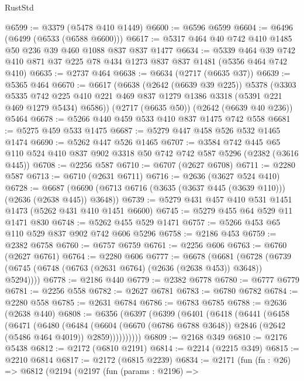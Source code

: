 \begin{lexlean}{RustStd}
\begin{coremodule}
@6599 := @3379 (@5478 @410 @1449)
@6600 := @6596 @6599
@6604 := @6496 (@6499 (@6533 (@6588 @6600)))
@6617 := @5317 @464 @40 @742 @410 @1485 @50 @236 @39 @460 @1088 @837 @837 @1477
@6634 := @5339
    @464
    @39
    @742
    @410
    @871
    @37
    @225
    @78
    @434
    @1273
    @837
    @837
    @1481
    (@5356 @464 @742 @410)
@6635 := @2737 @464
@6638 := @6634 (@2717 (@6635 @37))
@6639 := @5365 @464
@6670 := @6617
    (@6638
      (@2642 (@6639 @39 @225))
      @5378
      (@3303
        @5335
        @742
        @225
        @410
        @221
        @469
        @837
        @1279
        @1386
        @3318
        (@5391 @221 @469 @1279 @5434)
        @6586))
    (@2717 (@6635 @50))
    (@2642 (@6639 @40 @236))
    @5464
@6678 := @5266 @440 @459 @533 @410 @837 @1475 @742 @558
@6681 := @5275 @459 @533 @1475
@6687 := @5279 @447 @458 @526 @532 @1465 @1474
@6690 := @5262 @447 @526 @1465
@6707 := @3584
    @742
    @445
    @65
    @110
    @524
    @410
    @837
    @902
    @3318
    @50
    @742
    @742
    @587
    @5296
    (@2382 (@3616 @445))
@6708 := @2256 @587
@6710 := @6707 (@2627 @6708)
@6711 := @2280 @587
@6713 := @6710 (@2631 @6711)
@6716 := @2636 (@3627 @524 @410)
@6728 := @6687 (@6690 (@6713 @6716 (@3635 (@3637 @445 (@3639 @110))) (@2636 (@2638 @445)) @3648))
@6739 := @5279 @431 @457 @410 @531 @1451 @1473 (@5262 @431 @410 @1451 @6600)
@6745 := @5279 @455 @64 @529 @11 @1471 @830
@6748 := @5262 @455 @529 @1471
@6757 := @5266 @453 @65 @110 @529 @837 @902 @742 @606 @5296
@6758 := @2186 @453
@6759 := @2382 @6758
@6760 := @6757 @6759
@6761 := @2256 @606
@6763 := @6760 (@2627 @6761)
@6764 := @2280 @606
@6777 := @6678
    (@6681 (@6728 (@6739 (@6745 (@6748 (@6763 (@2631 @6764) (@2636 (@2638 @453)) @3648)) @5294))))
@6778 := @2186 @440
@6779 := @2382 @6778
@6780 := @6777 @6779
@6781 := @2256 @558
@6782 := @2627 @6781
@6783 := @6780 @6782
@6784 := @2280 @558
@6785 := @2631 @6784
@6786 := @6783 @6785
@6788 := @2636 (@2638 @440)
@6808 := @6356
    (@6397
      (@6399
        (@6401
          (@6418
            (@6441
              (@6458
                (@6471
                  (@6480
                    (@6484
                      (@6604
                        (@6670 (@6786 @6788 @3648))
                        @2846
                        (@2642 (@5486 @464 @4019))
                        @2859))))))))))
@6809 := @2168 @349
@6810 := @2176 @5438
@6812 := @2172 (@6810 @2191)
@6814 := @2214 (@2215 @349)
@6815 := @2210 @6814
@6817 := @2172 (@6815 @2239)
@6834 := @2171
    (fun (fn : @26) =>
    @6812
      (@2194
        (@2197
          (fun (params : @2196) =>

\end{coremodule}
\end{lexlean}
